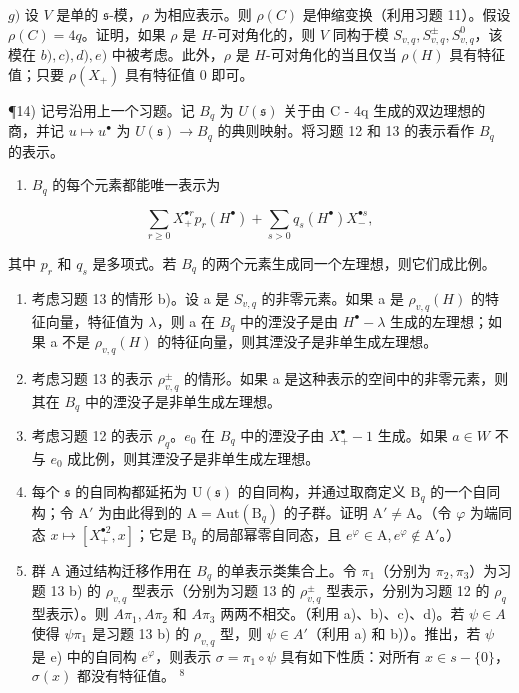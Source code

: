 \(g)\) 设 \(V\) 是单的 \(\mathfrak{s}\)-模，\(\rho\) 为相应表示。则 \(\rho(C)\) 是伸缩变换（利用习题 11）。假设 \(\rho(C) = 4q\)。证明，如果 \(\rho\) 是 \(H\)-可对角化的，则 \(V\) 同构于模 \(S_{v,q}, S_{v,q}^{\pm}, S_{v,q}^{0}\)，该模在 \(b), c), d), e)\) 中被考虑。此外，\(\rho\) 是 \(H\)-可对角化的当且仅当 \(\rho(H)\) 具有特征值；只要 \(\rho(X_{+})\) 具有特征值 \(0\) 即可。

¶14) 记号沿用上一个习题。记 \(B_{q}\) 为 \(U(\mathfrak{s})\) 关于由 C - 4q 生成的双边理想的商，并记 \(u \mapsto u^{\bullet}\) 为 \(U(\mathfrak{s}) \to B_{q}\) 的典则映射。将习题 12 和 13 的表示看作 \(B_{q}\) 的表示。

\begin{enumerate}
\def\labelenumi{\alph{enumi})}
\tightlist
\item
  \(B_{q}\) 的每个元素都能唯一表示为
\end{enumerate}

\[
\sum_ {r \geq 0} X _ {+} ^ {\bullet r} p _ {r} (H ^ {\bullet}) + \sum_ {s > 0} q _ {s} (H ^ {\bullet}) X _ {-} ^ {\bullet s},
\]

其中 \(p_{r}\) 和 \(q_{s}\) 是多项式。若 \(B_{q}\) 的两个元素生成同一个左理想，则它们成比例。

\begin{enumerate}
\def\labelenumi{\alph{enumi})}
\setcounter{enumi}{1}
\item
  考虑习题 13 的情形 b)。设 a 是 \(S_{v,q}\) 的非零元素。如果 a 是 \(\rho_{v,q}(H)\) 的特征向量，特征值为 \(\lambda\)，则 a 在 \(B_{q}\) 中的湮没子是由 \(H^{\bullet}-\lambda\) 生成的左理想；如果 a 不是 \(\rho_{v,q}(H)\) 的特征向量，则其湮没子是非单生成左理想。
\item
  考虑习题 13 的表示 \(\rho_{v,q}^{\pm}\) 的情形。如果 a 是这种表示的空间中的非零元素，则其在 \(B_{q}\) 中的湮没子是非单生成左理想。
\item
  考虑习题 12 的表示 \(\rho_{q}\)。\(e_{0}\) 在 \(B_{q}\) 中的湮没子由 \(X_{+}^{\bullet}-1\) 生成。如果 \(a\in W\) 不与 \(e_{0}\) 成比例，则其湮没子是非单生成左理想。
\item
  每个 \(\mathfrak{s}\) 的自同构都延拓为 \(\mathrm{U}(\mathfrak{s})\) 的自同构，并通过取商定义 \(\mathrm{B}_q\) 的一个自同构；令 \(\mathrm{A}'\) 为由此得到的 \(\mathrm{A} = \mathrm{Aut}(\mathrm{B}_q)\) 的子群。证明 \(\mathrm{A}' \neq \mathrm{A}\)。（令 \(\varphi\) 为端同态 \(x \mapsto [X_{+}^{\bullet 2}, x]\)；它是 \(\mathrm{B}_q\) 的局部幂零自同态，且 \(e^{\varphi} \in \mathrm{A}, e^{\varphi} \notin \mathrm{A}'\)。）
\item
  群 A 通过结构迁移作用在 \(B_{q}\) 的单表示类集合上。令 \(\pi_{1}\)（分别为 \(\pi_{2},\pi_{3}\)）为习题 13 b) 的 \(\rho_{v,q}\) 型表示（分别为习题 13 的 \(\rho_{v,q}^{\pm}\) 型表示，分别为习题 12 的 \(\rho_{q}\) 型表示）。则 \(A\pi_{1},A\pi_{2}\) 和 \(A\pi_{3}\) 两两不相交。（利用 a)、b)、c)、d)。若 \(\psi\in A\) 使得 \(\psi\pi_{1}\) 是习题 13 b) 的 \(\rho_{v,q}\) 型，则 \(\psi\in A'\)（利用 a) 和 b)）。推出，若 \(\psi\) 是 e) 中的自同构 \(e^{\varphi}\)，则表示 \(\sigma=\pi_{1}\circ\psi\) 具有如下性质：对所有 \(x\in s-\{0\}\)，\(\sigma(x)\) 都没有特征值。 \(^{8}\)
\end{enumerate}

